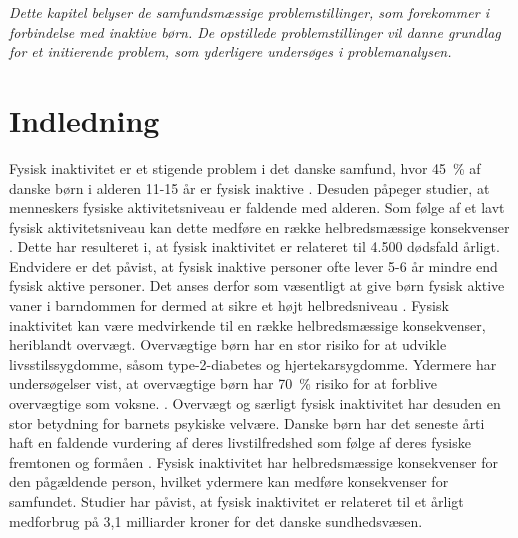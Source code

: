 \textit{Dette kapitel belyser de samfundsmæssige problemstillinger, som forekommer i forbindelse med inaktive børn. De opstillede problemstillinger vil danne grundlag for et initierende problem, som yderligere undersøges i problemanalysen.}

\section{Indledning}
Fysisk inaktivitet er et stigende problem i det danske samfund, hvor 45~\% af danske børn i alderen 11-15 år er fysisk inaktive \citep{Sundhedsstyrelsen2006}. Desuden påpeger studier, at menneskers fysiske aktivitetsniveau er faldende med alderen. Som følge af et lavt fysisk aktivitetsniveau kan dette medføre en række helbredsmæssige konsekvenser \citep{Sundhedsstyrelsen2006}. Dette har resulteret i, at fysisk inaktivitet er relateret til 4.500 dødsfald årligt. Endvidere er det påvist, at fysisk inaktive personer ofte lever 5-6 år mindre end fysisk aktive personer. \citep{JuelSoerensenBroennum-Hansen2006} Det anses derfor som væsentligt at give børn fysisk aktive vaner i barndommen for dermed at sikre et højt helbredsniveau \citep{L.MeyerP.Gullotta2012}. \newline
Fysisk inaktivitet kan være medvirkende til en række helbredsmæssige konsekvenser, heriblandt overvægt. Overvægtige børn har en stor risiko for at udvikle
livsstilssygdomme, såsom type-2-diabetes og hjertekarsygdomme. Ydermere har undersøgelser vist, at overvægtige børn har 70~\% risiko for at forblive overvægtige som voksne. \citep{Reilly2006}. Overvægt og særligt fysisk inaktivitet har desuden en stor betydning for barnets psykiske velvære. Danske børn har det seneste årti haft en faldende vurdering af deres livstilfredshed som følge af deres fysiske fremtonen og formåen \citep{Universitet2014,StatensInstitutforFolkesundhed2007}. \newline
Fysisk inaktivitet har helbredsmæssige konsekvenser for den pågældende person, hvilket ydermere kan medføre konsekvenser for samfundet. Studier har påvist, at fysisk inaktivitet er relateret til et årligt medforbrug på 3,1 milliarder kroner for det danske sundhedsvæsen. \citep{JuelSoerensenBroennum-Hansen2006}

